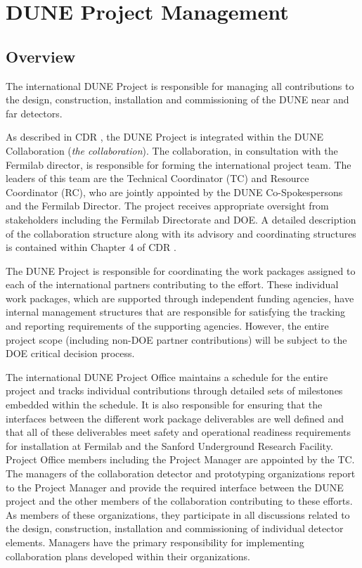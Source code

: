 \chapter{DUNE Project Management}
\label{ch:detectors-pm}

\section{Overview}


The international DUNE Project is responsible for managing all
contributions to the design, construction, installation and
commissioning of the DUNE near and far detectors.

As described in CDR \volintro, the DUNE Project is integrated within the
DUNE Collaboration (\textit{the collaboration}).  The collaboration, in consultation with the
Fermilab director, is responsible for forming the international
project team.  The leaders of this team are the Technical Coordinator
(TC) and Resource Coordinator (RC), who are jointly appointed by the
DUNE Co-Spokespersons and the Fermilab Director.  The project receives
appropriate oversight from stakeholders including the Fermilab
Directorate and DOE.  A detailed description of the collaboration
structure along with its advisory and coordinating structures is
contained within Chapter 4  of CDR \volintro.

The DUNE Project is responsible for coordinating the work
packages assigned to each of the international partners contributing
to the effort.  These individual work packages, which are supported
through independent funding agencies, have internal management
structures that are responsible for satisfying the tracking and
reporting requirements of the supporting agencies.  However, the
entire project scope (including non-DOE partner contributions) will be
subject to the DOE critical decision process.

The international DUNE Project Office maintains a schedule for the
entire project and tracks individual contributions through detailed
sets of milestones embedded within the schedule.  It is also responsible
for ensuring that the interfaces between the different work package
deliverables are well defined and that all of these deliverables meet
safety and operational readiness requirements for installation at
Fermilab and the Sanford Underground Research Facility.  Project
Office members including the Project Manager are appointed by the TC.
The managers of the collaboration detector and prototyping
organizations report to the Project Manager and provide the required
interface between the DUNE project and the other members of the
collaboration contributing to these efforts.  As members of these
organizations, they participate in all discussions related to the
design, construction, installation and commissioning of individual
detector elements.  Managers have the primary responsibility for
implementing collaboration plans developed within their organizations.
 
